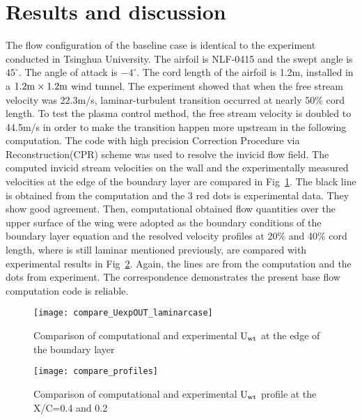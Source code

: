 \documentclass{AIAA}
\begin{document}
\section{Results and discussion}
The flow configuration of the baseline case is identical to the experiment conducted in Tsinghua University. The airfoil is NLF-0415 and the swept angle is $45^\circ$. The angle of attack is $-4^\circ$. The cord length of the airfoil is 1.2m, installed in a $1.2{\rm m}\times1.2{\rm m}$ wind tunnel. The experiment showed that when the free stream velocity was 22.3m/s, laminar-turbulent transition occurred at nearly 50\% cord length. To test the plasma control method, the free stream velocity is doubled to 44.5m/s in order to make the transition happen more upstream in the following computation. The code with high precision Correction Procedure via Reconstruction(CPR)\cite{WangZJ2009} scheme was used to resolve the invicid flow field. The computed invicid stream velocities on the wall and the experimentally measured velocities at the edge of the boundary layer are compared in Fig~\ref{f:ConpareInvicidV}. The black line is obtained from the computation and the 3 red dots is experimental data. They show good agreement. Then, computational obtained flow quantities over the upper surface of the wing were adopted as the boundary conditions of the boundary layer equation and the resolved velocity profiles at 20\% and 40\% cord length, where is still laminar mentioned previously, are compared with experimental results in Fig~\ref{f:compare_profiles}. Again, the lines are from the computation and the dots from experiment. The correspondence demonstrates the present base flow computation code is reliable.
\begin{figure}
\centering
  \texttt{[image: compare\_UexpOUT\_laminarcase]}
\caption{Comparison of computational and experimental $\rm{U_{wt}}$ at the edge of the boundary layer}
\label{f:ConpareInvicidV}
\end{figure}

\begin{figure}
\centering
  \texttt{[image: compare\_profiles]}
\caption{Comparison of computational and experimental $\rm{U_{wt}}$ profile at the X/C=0.4 and 0.2}
\label{f:compare_profiles}
\end{figure}
\end{document}
